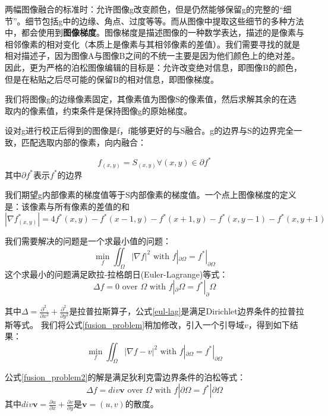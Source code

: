 两幅图像融合的标准时：允许图像g改变颜色，但是仍然能够保留g的完整的“细节”。细节包括g中的边缘、角点、过度等等。而从图像中提取这些细节的多种方法中，都会使用到\textbf{图像梯度}。图像梯度是描述图像的一种数学表达，描述的是像素与相邻像素的相对变化（本质上是像素与其相邻像素的差值）。我们需要寻找的就是相对描述子，因为图像A与图像B之间的不统一主要是因为他们颜色上的绝对差。因此，更为严格的泊松图像编辑的目标是：允许改变绝对信息，即图像B的颜色，但是在粘贴之后尽可能的保留B的相对信息，即图像梯度。

我们将图像g的边缘像素固定，其像素值为图像S的像素值，然后求解其余的在选取内的像素值，约束条件是保持图像g的原始梯度。

设对g进行校正后得到的图像是f，f能够更好的与S融合。g的边界与S的边界完全一致，匹配选取内部的像素，向内融合：

\begin{equation}
f_{(x,y)} = S_{(x,y)}\forall{(x,y)}\in{\partial{f^*}}
\end{equation}
其中\(\partial{f^*}\)表示\(f^*\)的边界

我们期望g内部像素的梯度值等于S内部像素的梯度值。一个点上图像梯度的定义是：该像素与所有像素的差值的和
\begin{equation}
|\nabla{f^*_{(x,y)}}| = 4f^*(x,y) - f^*(x-1,y) - f^*(x+1,y) - f^*(x,y-1) - f^*(x,y+1)
\end{equation}

我们需要解决的问题是一个求最小值的问题：
\begin{equation}
\mathop {min}\limits_{f}\iint_{\Omega}^{} |\nabla{f}|^2\text{ with }f|_{\partial\Omega} = f^*|_{\partial\Omega}
\label{fusion_problem}
\end{equation}
这个求最小的问题满足欧拉-拉格朗日(Euler-Lagrange)等式：
\begin{equation}
\Delta f = 0\text{ over }\Omega\text{ with }f|_\partial{\Omega} = f^*|_\partial{\Omega}
\label{eul-lag}
\end{equation}

其中\(\Delta = \frac{\partial^2.}{\partial{x^2}}+\frac{\partial^2.}{\partial{y^2}}\)是拉普拉斯算子，公式\eqref{eul-lag}是满足Dirichlet边界条件的拉普拉斯等式。
我们将公式\eqref{fusion_problem}稍加修改，引入一个引导域\(v\)，得到如下结果：
\begin{equation}
\mathop {min}\limits_{f}\iint_{\Omega}^{} |\nabla{f} - v|^2\text{ with }f|_{\partial\Omega} = f^*|_{\partial\Omega}
\label{fusion_problem2}
\end{equation}

公式\eqref{fusion_problem2}的解是满足狄利克雷边界条件的泊松等式：
\begin{equation}
\Delta f = div\mathbf{v}\text{ over }\Omega\text{ with }f|\partial{\Omega} = f^*|\partial{\Omega}
\label{poi_equ}
\end{equation}
其中\(div\mathbf{v} = \frac{\partial u}{\partial x}+\frac{\partial v}{\partial y}\)是\(\mathbf{v} = (u,v)\)的散度。

